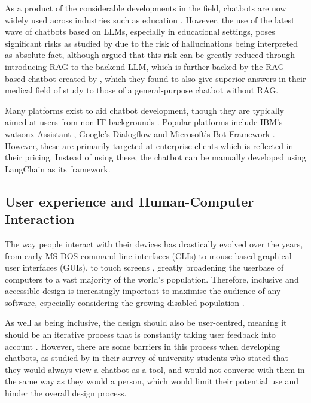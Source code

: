 \documentclass[12pt]{report}
\begin{document}
    As a product of the considerable developments in the field, chatbots are now widely used 
    across industries such as education \autocite{kuhail_interacting_2023}. However, the use of the latest wave of chatbots based on LLMs,
    especially in educational settings, poses significant risks as studied by \textcite{neumann_llm-driven_2024}
    due to the risk of hallucinations being interpreted as absolute fact, although \textcite{shuster_retrieval_2021} 
    argued that this risk can be greatly reduced through introducing RAG to the backend LLM, which is further backed 
    by the RAG-based chatbot created by \textcite{ge_development_2023}, which they found to also give superior answers
    in their medical field of study to those of a general-purpose chatbot without RAG.  


    Many platforms exist to aid chatbot development, though they are typically aimed at users from non-IT backgrounds 
    \autocite{srivastava_desirable_2020}. Popular platforms include IBM's watsonx Assistant \autocite{ibm_ibm_2024},
    Google's Dialogflow \autocite{google_conversational_nodate} and Microsoft's Bot Framework \autocite{microsoft_microsoft_nodate}.
    However, these are primarily targeted at enterprise clients which is reflected in their pricing. Instead of using these,
    the chatbot can be manually developed using LangChain as its framework.

    

    \subsection{User experience and Human-Computer Interaction}

    The way people interact with their devices has drastically evolved over the years, from early MS-DOS command-line 
    interfaces (CLIs) to mouse-based graphical user interfaces (GUIs), to touch screens \autocite{kotian_systematic_2024}, greatly broadening
    the userbase of computers to a vast majority of the world's 
    population. Therefore, inclusive and accessible design is increasingly important to maximise the audience of any software,
    especially considering the growing disabled population \autocite{putnam_how_2012}. 
    
    As well as being inclusive, the design 
    should also be user-centred, meaning it should be an iterative process that is constantly taking user feedback 
    into account \autocite{chammas_closer_2015}. However, there are some barriers in this process when developing 
    chatbots, as studied by \textcite{clark_what_2019} in their survey of university students who stated that they would 
    always view a chatbot as a tool, and would not converse with them in the same way as they would a person, which would 
    limit their potential use and hinder the overall design process. 
\end{document}
